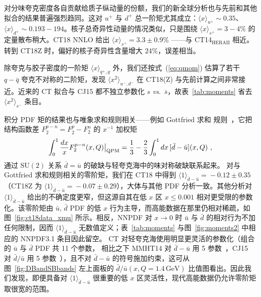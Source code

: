 对分味夸克密度各自贡献给质子纵动量的份额，我们的新全球分析也与先前和其他拟合的结果普遍强烈趋同。这对 $u^+$ 与 $d^+$ 总一阶矩尤其成立：$\langle x \rangle_{u^+}\! \sim\! 0.35$、$\langle x \rangle_{d^+}\! \sim\! 0.193\!-\!194$。核子总奇异性动量的情况类似，只是围绕 $\langle x \rangle_{s^+}\! =\! 3-4\%$ 的定量散布稍大。CT18 NNLO 给出 $\langle x \rangle_{s^+} = 3.3 \pm 0.9\%$ ——与 CT14$_\mathrm{HERAII}$ 相近。
转到 CT18Z 时，偏好的核子奇异性含量增大 $24\%$，误差相当。


除夸克与胶子密度的一阶矩 $\langle x \rangle_{q^+,g}$ 外，我们还按式~(\ref{eq:qmom}) 估算了若干 $q-\bar{q}$ 夸克不对称的二阶矩，发现 $\langle x^2 \rangle_{u^-,d^-}$ 在 CT18(Z) 与先前计算之间非常接近。近来的 CT 拟合与 CJ15 都不独立参数化 $s$ {\it vs}.~$\overline{s}$，故表~\ref{tab:moments} 省去 $\langle x^2 \rangle_{s^-}$ 条目。


积分 PDF 矩的结果也与唯象求和规则相关——例如 Gottfried 求和
规则~\cite{Gottfried:1967kk}，它把结构函数差 $F^{p-n}_2 = F^{p}_2\! -\! F^{n}_2$ 的 $x^{-1}$ 加权矩
\begin{equation}
\int_0^1\frac{dx}{x}F^{p-n}_2(x,Q)\big|_\mathrm{QPM} =\frac{1}{3} - \frac{2}{3}\int_{0}^{1} dx\, [\bar{d}-\bar{u}](x,Q)\ ,
\label{eq:Gott}
\end{equation}
通过 $\mathrm{SU}(2)$ 关系 $\overline{d} = \overline{u}$ 的破缺与轻夸克海中的味对称破缺联系起来。
对与 Gottfried 求和规则相关的零阶矩，我们在 CT18 中得到 $\langle 1 \rangle_{\bar{d}-\bar{u}}\! =\! -0.12\!\pm\!0.35$
（CT18Z 为 $\langle 1 \rangle_{\bar{d}-\bar{u}}\! =\! -0.07\!\pm\!0.29$），大体与其他 PDF 分析一致。其他分析对 $\langle 1 \rangle_{\bar{d}-\bar{u}}$ 给出的不确定度更窄，但这源自其在低 $x$ 区 $x\! \le\! 0.001$ 相对更受限的参数化。该零阶矩由 $\bar{u},\,\bar{d}$ PDF 的低 $x$ 行为主导，而高能数据在那里仍相对稀疏，如图~\ref{fig:ct18data_xmu} 所示。相反，NNPDF 对 $x \to 0$ 时 $\bar{u}$ 与 $\bar{d}$ 的相对行为不加任何限制，因而
$\langle 1 \rangle_{\bar{d}-\bar{u}}$ 无数值定义；表~\ref{tab:moments}
与图~\ref{fig:moments2} 中相应的 NNPDF3.1 条目因此留空。
CT 对轻夸克海使用明显更灵活的参数化（组合的 $\bar u$ 与 $\bar d$ PDF 共 11 个参数，
相比之下 MMHT14 对 $\bar{d}-\bar{u}$ 用 5 参数~\cite{Harland-Lang:2014zoa}，CJ15 对 $\bar{d}/\bar{u}$ 用 5 参数~\cite{Accardi:2016qay}），且不对 $\bar{d}\!-\!\bar{u}$ 的符号施加约束，这可从图~\ref{fig:DBandSBbands} 左上面板的 $\bar{d}/\bar{u}(x,Q\!=\! 1.4\,\mathrm{GeV})$ 比值图看出。因此我们发现，即便具备对 $\langle 1 \rangle_{\bar{d}-\bar{u}}$ 很重要的低 $x$ 区灵活性，现代高能数据仍允许零阶矩取很宽的范围。


